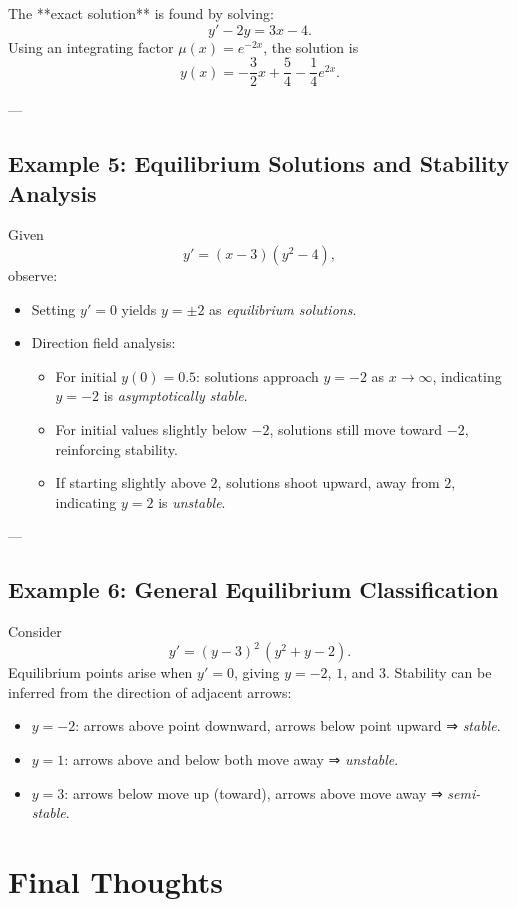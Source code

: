 \documentclass[12pt]{book}
\begin{document}
The **exact solution** is found by solving:
\[
y' - 2y = 3x - 4.
\]
Using an integrating factor \(\mu(x) = e^{-2x}\), the solution is
\[
y(x) = -\frac{3}{2}x + \frac{5}{4} - \frac{1}{4}e^{2x}.
\]

---

\subsection*{Example 5: Equilibrium Solutions and Stability Analysis}
Given
\[
y' = (x - 3)(y^2 - 4),
\]
observe:
\begin{itemize}
  \item Setting \(y' = 0\) yields \(y = \pm2\) as \emph{equilibrium solutions}.
  \item Direction field analysis:
    \begin{itemize}
      \item For initial \(y(0) = 0.5\): solutions approach \(y = -2\) as \(x \to \infty\), indicating \(y = -2\) is \emph{asymptotically stable}.
      \item For initial values slightly below \(-2\), solutions still move toward \(-2\), reinforcing stability.
      \item If starting slightly above \(2\), solutions shoot upward, away from \(2\), indicating \(y = 2\) is \emph{unstable}.
    \end{itemize}
\end{itemize}

---

\subsection*{Example 6: General Equilibrium Classification}
Consider
\[
y' = (y - 3)^2\,(y^2 + y - 2).
\]
Equilibrium points arise when \(y' = 0\), giving \(y = -2\), \(1\), and \(3\). Stability can be inferred from the direction of adjacent arrows:
\begin{itemize}
  \item \(y = -2\): arrows above point downward, arrows below point upward ⇒ \emph{stable}.
  \item \(y = 1\): arrows above and below both move away ⇒ \emph{unstable}.
  \item \(y = 3\): arrows below move up (toward), arrows above move away ⇒ \emph{semi-stable}.
\end{itemize}

\section{Final Thoughts}
\end{document}
